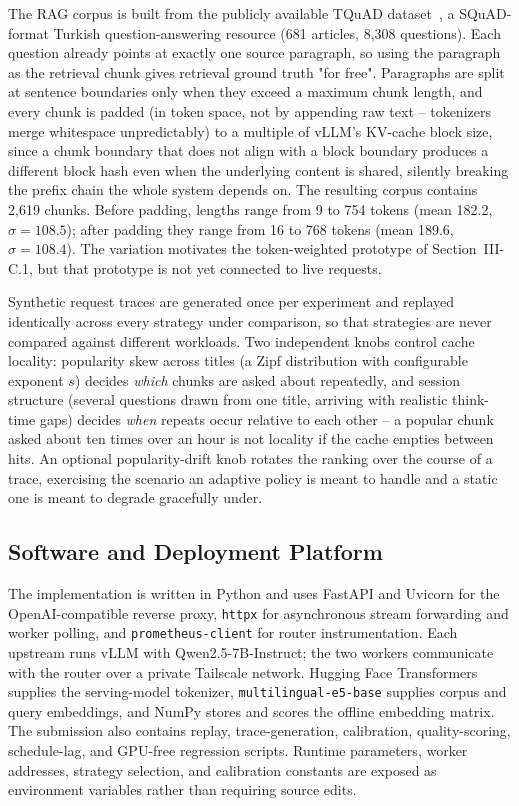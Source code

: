 \documentclass[conference]{IEEEtran}
\begin{document}
The RAG corpus is built from the publicly available TQuAD
dataset~\cite{tquad}, a SQuAD-format Turkish question-answering resource
(681 articles, 8{,}308 questions). Each
question already points at exactly one source paragraph, so using the
paragraph as the retrieval chunk gives retrieval ground truth "for
free". Paragraphs are split at sentence boundaries only when they
exceed a maximum chunk length, and every chunk is padded (in token
space, not by appending raw text -- tokenizers merge whitespace
unpredictably) to a multiple of vLLM's KV-cache block size, since a
chunk boundary that does not align with a block boundary produces a
different block hash even when the underlying content is shared,
silently breaking the prefix chain the whole system depends on. The
resulting corpus contains 2{,}619 chunks. Before padding, lengths range
from 9 to 754 tokens (mean 182.2, $\sigma{=}108.5$); after padding they
range from 16 to 768 tokens (mean 189.6, $\sigma{=}108.4$). The
variation motivates the token-weighted prototype of Section~III-C.1,
but that prototype is not yet connected to live requests.

Synthetic request traces are generated once per experiment and replayed
identically across every strategy under comparison, so that strategies
are never compared against different workloads. Two independent knobs
control cache locality: popularity skew across titles (a Zipf
distribution with configurable exponent $s$) decides \emph{which}
chunks are asked about repeatedly, and session structure (several
questions drawn from one title, arriving with realistic think-time
gaps) decides \emph{when} repeats occur relative to each other -- a
popular chunk asked about ten times over an hour is not locality if the
cache empties between hits. An optional popularity-drift knob rotates
the ranking over the course of a trace, exercising the scenario an
adaptive policy is meant to handle and a static one is meant to
degrade gracefully under.

\subsection{Software and Deployment Platform}

The implementation is written in Python and uses FastAPI and Uvicorn for
the OpenAI-compatible reverse proxy, \texttt{httpx} for asynchronous
stream forwarding and worker polling, and \texttt{prometheus-client}
for router instrumentation. Each upstream runs vLLM with
Qwen2.5-7B-Instruct; the two workers communicate with the router over a
private Tailscale network. Hugging Face Transformers supplies the
serving-model tokenizer, \texttt{multilingual-e5-base} supplies corpus
and query embeddings, and NumPy stores and scores the offline embedding
matrix. The submission also contains replay, trace-generation,
calibration, quality-scoring, schedule-lag, and GPU-free regression
scripts. Runtime parameters, worker addresses, strategy selection, and
calibration constants are exposed as environment variables rather than
requiring source edits.
\end{document}
